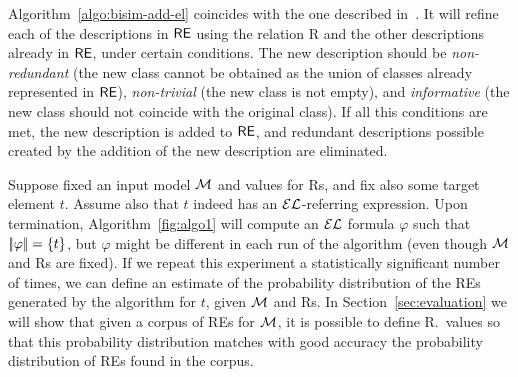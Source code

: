 Algorithm~\ref{algo:bisim-add-el} coincides with the one described in~\cite{arec2:2008:Areces}.  It will refine each of the descriptions in $\textsf{RE}$ using the relation R and the other descriptions already in $\textsf{RE}$, under certain conditions. The new description should be \emph{non-redundant} (the new  class cannot be obtained as the union of classes already represented in $\textsf{RE}$), \emph{non-trivial} (the new class is not empty), and 
\emph{informative} (the new class should not coincide with the original class).  If all this conditions are met, the new description is added to $\textsf{RE}$, and redundant descriptions possible created by the addition of the new description are eliminated.   

Suppose fixed an input model $\mathcal{M}$ and values for Rs, and fix also some target element $t$.  Assume also that $t$ indeed has an $\mathcal{EL}$-referring expression.  Upon termination, Algorithm~\ref{fig:algo1} will compute an $\mathcal{EL}$ formula $\varphi$ such that $|\!|\varphi|\!| = \{t\}$, but $\varphi$ might be different in each run of the algorithm (even though $\mathcal{M}$ and Rs are fixed).  If we repeat this experiment a statistically significant number of times, we can define an estimate of the probability distribution of the REs generated by the algorithm for $t$, given $\mathcal{M}$ and Rs. In Section~\ref{sec:evaluation} we will show that given a corpus of REs for $\mathcal{M}$, it is possible to define R.\puse\ values so that this probability distribution matches with good accuracy the probability distribution of REs found in the corpus.  
